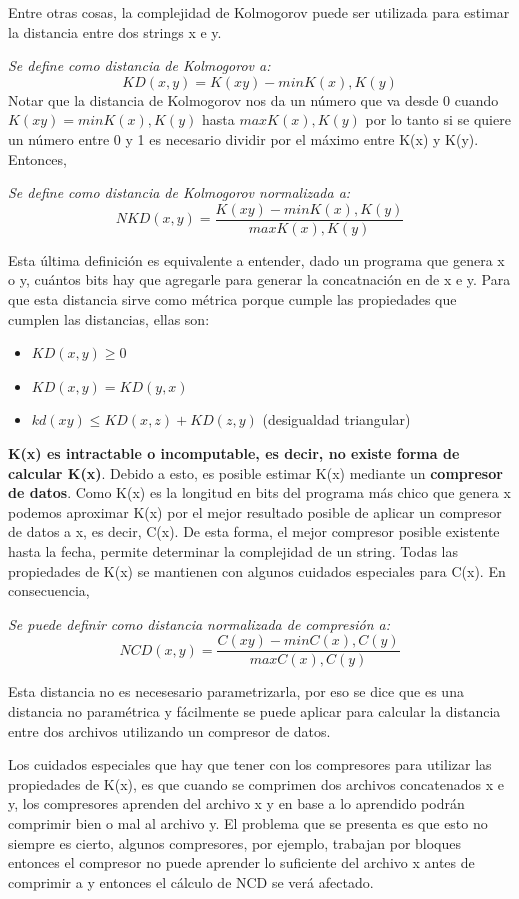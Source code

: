 \documentclass[titlepage,a4paper]{article}
\begin{document}
Entre otras cosas, la complejidad de Kolmogorov puede ser utilizada para estimar la distancia entre dos strings x e y. 

\textit{Se define como distancia de Kolmogorov a:} $$KD(x,y) =  K(xy) - min{K(x), K(y)}$$
Notar que la distancia de Kolmogorov nos da un número que va desde 0 cuando$ K(xy) = min{K(x),K(y)} $ hasta $max{K(x),K(y)}$ por lo tanto si se quiere un número entre 0 y 1 es necesario dividir por el máximo entre K(x) y K(y). Entonces, 

\textit{Se define como distancia de Kolmogorov normalizada a:}$$ NKD(x,y) = \frac{K(xy) - min{K(x), K(y)}}{max{K(x),K(y)}}$$

Esta última definición es equivalente a entender, dado un programa que genera x o y, cuántos bits hay que agregarle para generar la concatnación en de x e y. Para que esta distancia sirve como métrica porque cumple las propiedades que cumplen las distancias, ellas son:
\begin{itemize}
\item $KD(x,y) \geq 0$
\item $KD(x,y) =  KD(y,x)$
\item $kd(xy) \leq KD(x,z) + KD(z,y)$ (desigualdad triangular)
\end{itemize}

\textbf{K(x) es intractable o incomputable, es decir, no existe forma de calcular K(x)}. Debido a esto, es posible estimar K(x) mediante un \textbf{compresor de datos}. Como K(x) es la longitud en bits del programa más chico que genera x podemos aproximar K(x) por el mejor resultado posible de aplicar un compresor de datos a x, es decir, C(x). De esta forma, el mejor compresor posible existente hasta la fecha, permite determinar la complejidad de un string. Todas las propiedades de K(x) se mantienen con algunos cuidados especiales para C(x). En consecuencia, 

\textit{Se puede definir como distancia normalizada de compresión a:} $$ NCD(x,y) = \frac{C(xy) - min{C(x), C(y)}}{max{C(x),C(y)}}$$

Esta distancia no es necesesario parametrizarla, por eso se dice que es una distancia no paramétrica y fácilmente se puede aplicar para calcular la distancia entre dos archivos utilizando un compresor de datos. 

Los cuidados especiales que hay que tener con los compresores para utilizar las propiedades de K(x), es que cuando se comprimen dos archivos concatenados x e y, los compresores aprenden del archivo x y en base a lo aprendido podrán comprimir bien o mal al archivo y. El problema que se presenta es que esto no siempre es cierto, algunos compresores, por ejemplo,  trabajan por bloques entonces el compresor no puede aprender lo suficiente del archivo x antes de comprimir a y entonces el cálculo de NCD se verá afectado. 
\end{document}
